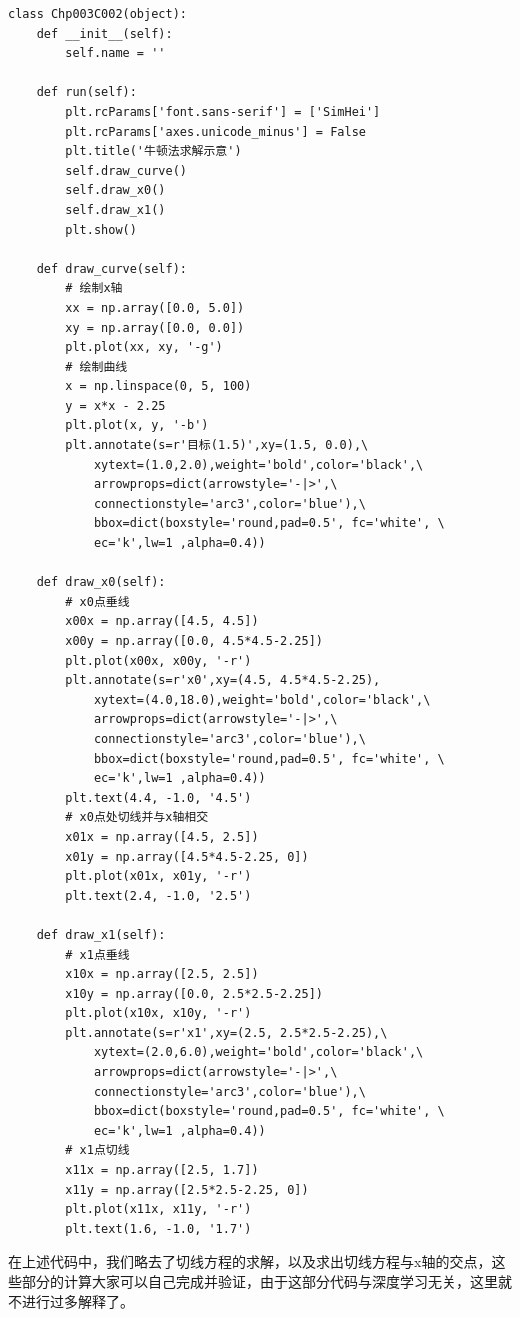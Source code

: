 \documentclass[UTF8]{article}
\begin{document}
\begin{lstlisting}
class Chp003C002(object):
    def __init__(self):
        self.name = ''

    def run(self):
        plt.rcParams['font.sans-serif'] = ['SimHei']
        plt.rcParams['axes.unicode_minus'] = False
        plt.title('牛顿法求解示意')
        self.draw_curve()
        self.draw_x0()
        self.draw_x1()
        plt.show()
    
    def draw_curve(self):
        # 绘制x轴
        xx = np.array([0.0, 5.0])
        xy = np.array([0.0, 0.0])
        plt.plot(xx, xy, '-g')
        # 绘制曲线
        x = np.linspace(0, 5, 100)
        y = x*x - 2.25
        plt.plot(x, y, '-b')
        plt.annotate(s=r'目标(1.5)',xy=(1.5, 0.0),\
            xytext=(1.0,2.0),weight='bold',color='black',\
            arrowprops=dict(arrowstyle='-|>',\
            connectionstyle='arc3',color='blue'),\
            bbox=dict(boxstyle='round,pad=0.5', fc='white', \
            ec='k',lw=1 ,alpha=0.4))

    def draw_x0(self):
        # x0点垂线
        x00x = np.array([4.5, 4.5])
        x00y = np.array([0.0, 4.5*4.5-2.25])
        plt.plot(x00x, x00y, '-r')
        plt.annotate(s=r'x0',xy=(4.5, 4.5*4.5-2.25),
            xytext=(4.0,18.0),weight='bold',color='black',\
            arrowprops=dict(arrowstyle='-|>',\
            connectionstyle='arc3',color='blue'),\
            bbox=dict(boxstyle='round,pad=0.5', fc='white', \
            ec='k',lw=1 ,alpha=0.4))
        plt.text(4.4, -1.0, '4.5')
        # x0点处切线并与x轴相交
        x01x = np.array([4.5, 2.5])
        x01y = np.array([4.5*4.5-2.25, 0])
        plt.plot(x01x, x01y, '-r')
        plt.text(2.4, -1.0, '2.5')

    def draw_x1(self):
        # x1点垂线
        x10x = np.array([2.5, 2.5])
        x10y = np.array([0.0, 2.5*2.5-2.25])
        plt.plot(x10x, x10y, '-r')
        plt.annotate(s=r'x1',xy=(2.5, 2.5*2.5-2.25),\
            xytext=(2.0,6.0),weight='bold',color='black',\
            arrowprops=dict(arrowstyle='-|>',\
            connectionstyle='arc3',color='blue'),\
            bbox=dict(boxstyle='round,pad=0.5', fc='white', \
            ec='k',lw=1 ,alpha=0.4))
        # x1点切线
        x11x = np.array([2.5, 1.7])
        x11y = np.array([2.5*2.5-2.25, 0])
        plt.plot(x11x, x11y, '-r')
        plt.text(1.6, -1.0, '1.7')
\end{lstlisting}
在上述代码中，我们略去了切线方程的求解，以及求出切线方程与x轴的交点，这些部分的计算大家可以自己完成并验证，由于这部分代码与深度学习无关，这里就不进行过多解释了。\newline
\end{document}
